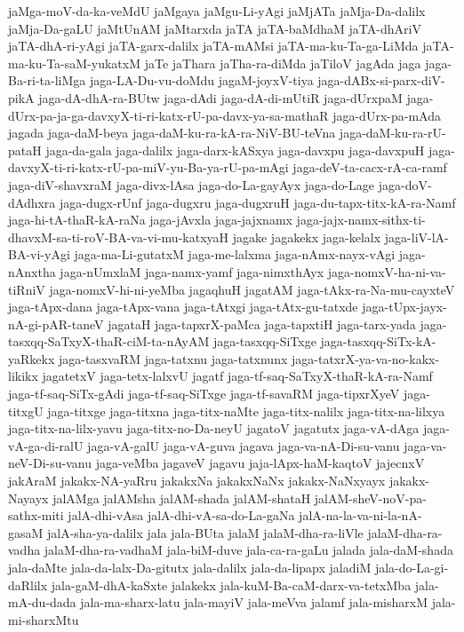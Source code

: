 {jaMga-moV-da-ka-veMdU
jaMgaya
jaMgu-Li-yAgi
jaMjATa
jaMja-Da-dalilx
jaMja-Da-gaLU
jaMtUnAM
jaMtarxda
jaTA
jaTA-baMdhaM
jaTA-dhAriV
jaTA-dhA-ri-yAgi
jaTA-garx-dalilx
jaTA-mAMsi
jaTA-ma-ku-Ta-ga-LiMda
jaTA-ma-ku-Ta-saM-yukatxM
jaTe
jaThara
jaTha-ra-diMda
jaTiloV
jagAda
jaga
jaga-Ba-ri-ta-liMga
jaga-LA-Du-vu-doMdu
jagaM-joyxV-tiya
jaga-dABx-si-parx-diV-pikA
jaga-dA-dhA-ra-BUtw
jaga-dAdi
jaga-dA-di-mUtiR
jaga-dUrxpaM
jaga-dUrx-pa-ja-ga-davxyX-ti-ri-katx-rU-pa-davx-ya-sa-mathaR
jaga-dUrx-pa-mAda
jagada
jaga-daM-beya
jaga-daM-ku-ra-kA-ra-NiV-BU-teVna
jaga-daM-ku-ra-rU-pataH
jaga-da-gala
jaga-dalilx
jaga-darx-kASxya
jaga-davxpu
jaga-davxpuH
jaga-davxyX-ti-ri-katx-rU-pa-miV-yu-Ba-ya-rU-pa-mAgi
jaga-deV-ta-cacx-rA-ca-ramf
jaga-diV-shavxraM
jaga-divx-lAsa
jaga-do-La-gayAyx
jaga-do-Lage
jaga-doV-dAdhxra
jaga-dugx-rUnf
jaga-dugxru
jaga-dugxruH
jaga-du-tapx-titx-kA-ra-Namf
jaga-hi-tA-thaR-kA-raNa
jaga-jAvxla
jaga-jajxnamx
jaga-jajx-namx-sithx-ti-dhavxM-sa-ti-roV-BA-va-vi-mu-katxyaH
jagake
jagakekx
jaga-kelalx
jaga-liV-lA-BA-vi-yAgi
jaga-ma-Li-gutatxM
jaga-me-lalxma
jaga-nAmx-nayx-vAgi
jaga-nAnxtha
jaga-nUmxlaM
jaga-namx-yamf
jaga-nimxthAyx
jaga-nomxV-ha-ni-va-tiRniV
jaga-nomxV-hi-ni-yeMba
jagaqhuH
jagatAM
jaga-tAkx-ra-Na-mu-cayxteV
jaga-tApx-dana
jaga-tApx-vana
jaga-tAtxgi
jaga-tAtx-gu-tatxde
jaga-tUpx-jayx-nA-gi-pAR-taneV
jagataH
jaga-tapxrX-paMca
jaga-tapxtiH
jaga-tarx-yada
jaga-tasxqq-SaTxyX-thaR-ciM-ta-nAyAM
jaga-tasxqq-SiTxge
jaga-tasxqq-SiTx-kA-yaRkekx
jaga-tasxvaRM
jaga-tatxnu
jaga-tatxnunx
jaga-tatxrX-ya-va-no-kakx-likikx
jagatetxV
jaga-tetx-lalxvU
jagatf
jaga-tf-saq-SaTxyX-thaR-kA-ra-Namf
jaga-tf-saq-SiTx-gAdi
jaga-tf-saq-SiTxge
jaga-tf-savaRM
jaga-tipxrXyeV
jaga-titxgU
jaga-titxge
jaga-titxna
jaga-titx-naMte
jaga-titx-nalilx
jaga-titx-na-lilxya
jaga-titx-na-lilx-yavu
jaga-titx-no-Da-neyU
jagatoV
jagatutx
jaga-vA-dAga
jaga-vA-ga-di-ralU
jaga-vA-galU
jaga-vA-guva
jagava
jaga-va-nA-Di-su-vanu
jaga-va-neV-Di-su-vanu
jaga-veMba
jagaveV
jagavu
jaja-lApx-haM-kaqtoV
jajecnxV
jakAraM
jakakx-NA-yaRru
jakakxNa
jakakxNaNx
jakakx-NaNxyayx
jakakx-Nayayx
jalAMga
jalAMsha
jalAM-shada
jalAM-shataH
jalAM-sheV-noV-pa-sathx-miti
jalA-dhi-vAsa
jalA-dhi-vA-sa-do-La-gaNa
jalA-na-la-va-ni-la-nA-gasaM
jalA-sha-ya-dalilx
jala
jala-BUta
jalaM
jalaM-dha-ra-liVle
jalaM-dha-ra-vadha
jalaM-dha-ra-vadhaM
jala-biM-duve
jala-ca-ra-gaLu
jalada
jala-daM-shada
jala-daMte
jala-da-lalx-Da-gitutx
jala-dalilx
jala-da-lipapx
jaladiM
jala-do-La-gi-daRlilx
jala-gaM-dhA-kaSxte
jalakekx
jala-kuM-Ba-caM-darx-va-tetxMba
jala-mA-du-dada
jala-ma-sharx-latu
jala-mayiV
jala-meVva
jalamf
jala-misharxM
jala-mi-sharxMtu
}
